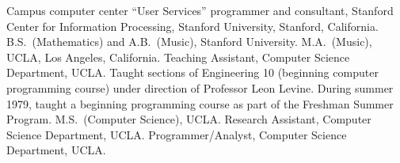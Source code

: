 %

\renewcommand{\vitastretch}{1.3}      %

\renewcommand{\vitadatewidth}{1.75in} %

\renewcommand{\vitatextwidth}{4.5in}  %

                {Campus computer center ``User Services'' programmer and
                consultant, Stanford Center for Information Processing,
                Stanford University, Stanford, California.}
                {B.S.~(Mathematics) and A.B.~(Music),
                Stanford University.}
                {M.A.~(Music), UCLA, Los Angeles, California.}
                {Teaching Assistant, Computer Science Department, UCLA.
                Taught sections of Engineering 10 (beginning computer
                programming course) under direction of Professor Leon
                Levine.
                During summer 1979, taught a beginning programming
                course as part of the Freshman Summer Program.}
                {M.S.~(Computer Science), UCLA.}
                {Research Assistant, Computer Science Department, UCLA.}
                {Programmer/Analyst, Computer Science Department, UCLA.}
                




